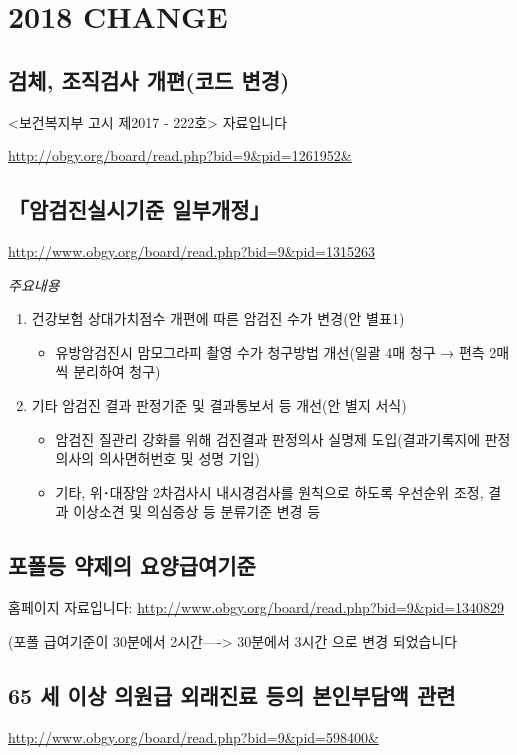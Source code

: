 ﻿\section{2018 CHANGE}
\subsection{검체, 조직검사 개편(코드 변경)}
<보건복지부 고시 제2017 - 222호> 자료입니다\par
\url{http://obgy.org/board/read.php?bid=9&pid=1261952&} \par
{}

\subsection{「암검진실시기준 일부개정」}
\url{http://www.obgy.org/board/read.php?bid=9&pid=1315263}

\emph{주요내용}
\begin{enumerate}[다.]\tightlist
\item 건강보험 상대가치점수 개편에 따른 암검진 수가 변경(안 별표1)
	\begin{itemize}\tightlist
	\item 유방암검진시 맘모그라피 촬영 수가 청구방법 개선(일괄 4매 청구 → 편측 2매씩 분리하여 청구)
	\end{itemize}
\item 기타 암검진 결과 판정기준 및 결과통보서 등 개선(안 별지 서식)
	\begin{itemize}\tightlist
	\item 암검진 질관리 강화를 위해 검진결과 판정의사 실명제 도입(결과기록지에 판정의사의 의사면허번호 및 성명 기입)
	\item 기타, 위･대장암 2차검사시 내시경검사를 원칙으로 하도록 우선순위 조정, 결과 이상소견 및 의심증상 등 분류기준 변경 등
	\end{itemize}
\end{enumerate}
\subsection{포폴등 약제의 요양급여기준} 
홈페이지 자료입니다: \url{http://www.obgy.org/board/read.php?bid=9&pid=1340829} \par
(포폴 급여기준이 30분에서 2시간----> 30분에서 3시간 으로 변경 되었습니다

\subsection{65 세 이상 의원급 외래진료 등의 본인부담액 관련}
\url{http://www.obgy.org/board/read.php?bid=9&pid=598400&}

